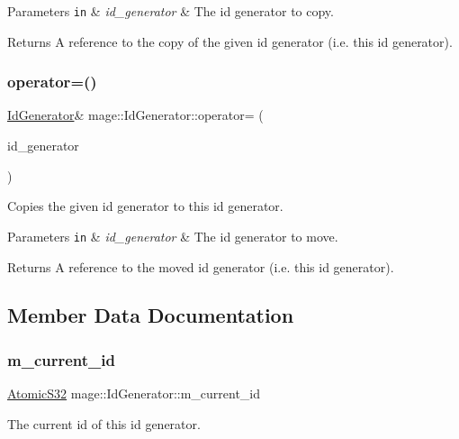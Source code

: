 \begin{DoxyParams}[1]{Parameters}
\mbox{\tt in}  & {\em id\+\_\+generator} & The id generator to copy. \\
\hline
\end{DoxyParams}
\begin{DoxyReturn}{Returns}
A reference to the copy of the given id generator (i.\+e. this id generator). 
\end{DoxyReturn}
\hypertarget{classmage_1_1_id_generator_aace8082947445d26d2421ba8b361f1bc}{}\label{classmage_1_1_id_generator_aace8082947445d26d2421ba8b361f1bc} 
\subsubsection{\texorpdfstring{operator=()}{operator=()}\hspace{0.1cm}{\footnotesize\ttfamily [2/2]}}
{\footnotesize\ttfamily \hyperlink{classmage_1_1_id_generator}{Id\+Generator}\& mage\+::\+Id\+Generator\+::operator= (\begin{DoxyParamCaption}\item[{\hyperlink{classmage_1_1_id_generator}{Id\+Generator} \&\&}]{id\+\_\+generator }\end{DoxyParamCaption})\hspace{0.3cm}{\ttfamily [delete]}}

Copies the given id generator to this id generator.


\begin{DoxyParams}[1]{Parameters}
\mbox{\tt in}  & {\em id\+\_\+generator} & The id generator to move. \\
\hline
\end{DoxyParams}
\begin{DoxyReturn}{Returns}
A reference to the moved id generator (i.\+e. this id generator). 
\end{DoxyReturn}


\subsection{Member Data Documentation}
\hypertarget{classmage_1_1_id_generator_af834ccd6b694775f434949a1c1382965}{}\label{classmage_1_1_id_generator_af834ccd6b694775f434949a1c1382965} 
\subsubsection{\texorpdfstring{m\+\_\+current\+\_\+id}{m\_current\_id}}
{\footnotesize\ttfamily \hyperlink{namespacemage_a34972c09c02b691cd7cc5ea34db1e778}{Atomic\+S32} mage\+::\+Id\+Generator\+::m\+\_\+current\+\_\+id\hspace{0.3cm}{\ttfamily [private]}}

The current id of this id generator. 